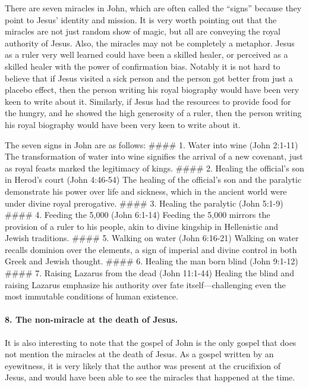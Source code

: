 There are seven miracles in John, which are often called the ``signs'' because they point to Jesus' identity and mission.
It is very worth pointing out that the miracles are not just random show of magic, but all are conveying the royal authority of Jesus.
Also, the miracles may not be completely a metaphor.
Jesus as a ruler very well learned could have been a skilled healer, or perceived as a skilled healer with the power of confirmation bias.
Notably it is not hard to believe that if Jesus visited a sick person and the person got better from just a placebo effect, then the person writing his royal biography would have been very keen to write about it.
Similarly, if Jesus had the resources to provide food for the hungry, and he showed the high generosity of a ruler, then the person writing his royal biography would have been very keen to write about it.

The seven signs in John are as follows: \#\#\#\# 1.
Water into wine (John 2:1-11) The transformation of water into wine signifies the arrival of a new covenant, just as royal feasts marked the legitimacy of kings.
\#\#\#\# 2.
Healing the official's son in Herod's court (John 4:46-54) The healing of the official's son and the paralytic demonstrate his power over life and sickness, which in the ancient world were under divine royal prerogative.
\#\#\#\# 3.
Healing the paralytic (John 5:1-9) \#\#\#\# 4.
Feeding the 5,000 (John 6:1-14) Feeding the 5,000 mirrors the provision of a ruler to his people, akin to divine kingship in Hellenistic and Jewish traditions.
\#\#\#\# 5.
Walking on water (John 6:16-21) Walking on water recalls dominion over the elements, a sign of imperial and divine control in both Greek and Jewish thought.
\#\#\#\# 6.
Healing the man born blind (John 9:1-12) \#\#\#\# 7.
Raising Lazarus from the dead (John 11:1-44) Healing the blind and raising Lazarus emphasize his authority over fate itself---challenging even the most immutable conditions of human existence.

\paragraph{8.
The non-miracle at the death of Jesus.}\label{par:the-non-miracle-at-the-death-of-jesus.}

It is also interesting to note that the gospel of John is the only gospel that does not mention the miracles at the death of Jesus.
As a gospel written by an eyewitness, it is very likely that the author was present at the crucifixion of Jesus, and would have been able to see the miracles that happened at the time.

